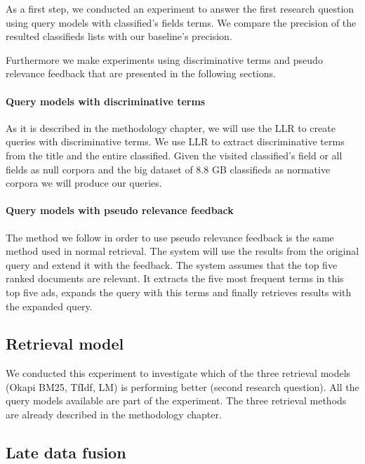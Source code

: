 As a first step, we conducted an experiment to answer the first research question using query models with classified’s fields terms. We compare the precision of the resulted classifieds lists with our baseline's precision. 

Furthermore we make experiments using discriminative terms and pseudo relevance feedback that are presented in the following sections.

 \paragraph{Query models with discriminative terms}

As it is described in the methodology chapter, we will use the LLR to create queries with discriminative terms. We use LLR to extract discriminative terms from the title and the entire classified. Given the visited classified's field or all fields as null corpora and the big dataset of 8.8 GB classifieds as normative corpora we will produce our queries.

 \paragraph{Query models with pseudo relevance feedback}

The method we follow in order to use pseudo relevance feedback is the same method used in normal retrieval. The system will use the results from the original query and extend it with the feedback. The system assumes that the top five ranked documents are relevant. It extracts the five most frequent terms in this top five ads, expands the query with this terms and finally retrieves results with the expanded query.



\subsection{Retrieval model}
We conducted this experiment to investigate which of the three retrieval models (Okapi BM25, TfIdf, LM) is performing better (second research question). All the query models available are part of the experiment. The three retrieval methods are already described in the methodology chapter.


\subsection{Late data fusion}

